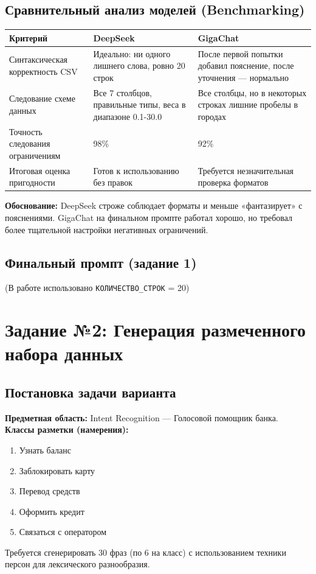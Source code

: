 \documentclass[oneside,a4paper,14pt]{extarticle} %
\begin{document}
\subsection{Сравнительный анализ моделей (Benchmarking)}
\noindent
\begin{table}[H]
\centering
\begin{tabular}{|p{4cm}|p{6cm}|p{6cm}|}
\hline
\textbf{Критерий} & \textbf{DeepSeek} & \textbf{GigaChat} \\ \hline
Синтаксическая корректность CSV & Идеально: ни одного лишнего слова, ровно 20 строк & После первой попытки добавил пояснение, после уточнения --- нормально \\ \hline
Следование схеме данных & Все 7 столбцов, правильные типы, веса в диапазоне 0.1-30.0 & Все столбцы, но в некоторых строках лишние пробелы в городах \\ \hline
Точность следования ограничениям & 98\% & 92\% \\ \hline
Итоговая оценка пригодности & Готов к использованию без правок & Требуется незначительная проверка форматов \\ \hline
\end{tabular}
\end{table}
\noindent
\textbf{Обоснование:} DeepSeek строже соблюдает форматы и меньше «фантазирует» с пояснениями. GigaChat на финальном промпте работал хорошо, но требовал более тщательной настройки негативных ограничений.
\newpage
\subsection{Финальный промпт (задание 1)}

\noindent
(В работе использовано \texttt{КОЛИЧЕСТВО\_СТРОК} = 20)
\newpage
\section{Задание №2: Генерация размеченного набора данных}
\subsection{Постановка задачи варианта}
\noindent
\textbf{Предметная область:} Intent Recognition --- Голосовой помощник банка. \\
\noindent
\textbf{Классы разметки (намерения):}
\begin{enumerate}
\item Узнать баланс
\item Заблокировать карту
\item Перевод средств
\item Оформить кредит
\item Связаться с оператором
\end{enumerate}
\noindent
Требуется сгенерировать 30 фраз (по 6 на класс) с использованием техники персон для лексического разнообразия.
\end{document}
